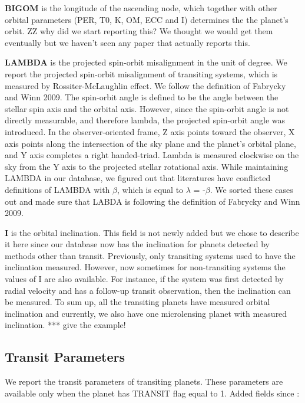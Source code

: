 \documentclass[11pt,preprint]{aastex}
\begin{document}
\begin{CJK*}{UTF8}{gbsn}
{\bf BIGOM} is the longitude of the ascending node, which together with other orbital parameters (PER, T0, K, OM, ECC and I) determines the the planet's orbit. 
ZZ why did we start reporting this?
We thought we would get them eventually but we haven't seen any paper that actually reports this.

{\bf LAMBDA} is the projected spin-orbit misalignment in the unit of degree. We report the projected spin-orbit misalignment of transiting systems, which is measured by Rossiter-McLaughlin effect. We follow the definition of Fabrycky and Winn 2009. The spin-orbit angle is defined to be the angle between the stellar spin axis and the orbital axis. However, since the spin-orbit angle is not directly measurable, and therefore lambda, the projected spin-orbit angle was introduced. In the observer-oriented frame, Z axis points toward the observer, X axis points along the intersection of the sky plane and the planet's orbital plane, and Y axis completes a right handed-triad. Lambda is measured clockwise on the sky from the Y axis to the projected stellar rotational axis. While maintaining LAMBDA in our database, we figured out that literatures have conflicted definitions of LAMBDA with $\beta$, which is equal to $\lambda$ = -$\beta$. We sorted these cases out and made sure that LABDA is following the definition of Fabrycky and Winn 2009. 


{\bf I} is the orbital inclination. This field is not newly added but we chose to describe it here since our database now has the inclination for planets detected by methods other than transit. Previously, only transiting systems used to have the inclination measured. However, now sometimes for
non-transiting systems the values of I are also available. For instance, if the system was first detected by radial velocity and has a follow-up transit observation, then the inclination can be measured. To sum up, all the transiting planets have measured orbital inclination and currently, we also have one microlensing planet with measured inclination. *** give the example!



\subsection{Transit Parameters}
We report the transit parameters of transiting planets. These parameters are available only when the planet has TRANSIT flag equal to 1. 
Added fields since \cite{Wright2011}:


\end{CJK*}
\end{document}
